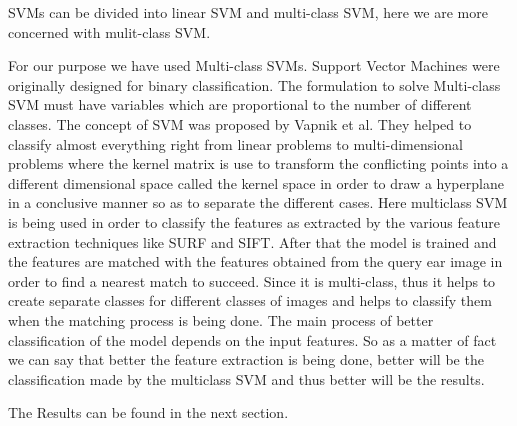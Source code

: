 SVMs can be divided into linear SVM and multi-class SVM, here we are more concerned with mulit-class SVM\cite{multiSVM}.

For our purpose we have used Multi-class SVMs. Support Vector Machines were originally designed for binary classification. The formulation to solve Multi-class SVM must have variables which are proportional to the number of different classes. The concept of SVM was proposed by Vapnik  et al. They helped to classify almost everything right from linear problems to multi-dimensional problems where the kernel matrix is use to transform the conflicting points into a different dimensional space called the kernel space in order to draw a hyperplane in a conclusive manner so as to separate the different cases. Here multiclass SVM is being used in order to classify the features as extracted by the various feature extraction techniques like SURF and SIFT. After that the model is trained and the features are matched with the features obtained from the query ear image in order to find a nearest match to succeed. Since it is multi-class, thus it helps to create separate classes for different classes of images and helps to classify them when the matching process is being done. The main process of better classification of the model depends on the input features. So as a matter of fact we can say that better the feature extraction is being done, better will be the classification made by the multiclass SVM and thus better will be the results.

The Results can be found in the next section.

